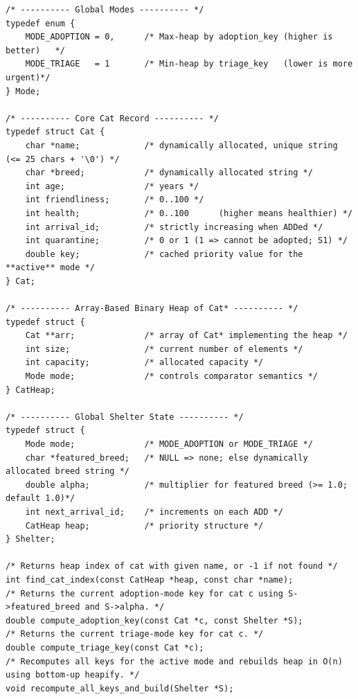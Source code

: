 \documentclass[11pt]{article}
\begin{document}
\begin{codebox}
\begin{lstlisting}
/* ---------- Global Modes ---------- */
typedef enum { 
    MODE_ADOPTION = 0,      /* Max-heap by adoption_key (higher is better)   */
    MODE_TRIAGE   = 1       /* Min-heap by triage_key   (lower is more urgent)*/
} Mode;

/* ---------- Core Cat Record ---------- */
typedef struct Cat {
    char *name;             /* dynamically allocated, unique string (<= 25 chars + '\0') */
    char *breed;            /* dynamically allocated string */
    int age;                /* years */
    int friendliness;       /* 0..100 */
    int health;             /* 0..100      (higher means healthier) */
    int arrival_id;         /* strictly increasing when ADDed */
    int quarantine;         /* 0 or 1 (1 => cannot be adopted; S1) */
    double key;             /* cached priority value for the **active** mode */
} Cat;

/* ---------- Array-Based Binary Heap of Cat* ---------- */
typedef struct {
    Cat **arr;              /* array of Cat* implementing the heap */
    int size;               /* current number of elements */
    int capacity;           /* allocated capacity */
    Mode mode;              /* controls comparator semantics */
} CatHeap;

/* ---------- Global Shelter State ---------- */
typedef struct {
    Mode mode;              /* MODE_ADOPTION or MODE_TRIAGE */
    char *featured_breed;   /* NULL => none; else dynamically allocated breed string */
    double alpha;           /* multiplier for featured breed (>= 1.0; default 1.0)*/
    int next_arrival_id;    /* increments on each ADD */
    CatHeap heap;           /* priority structure */
} Shelter;

/* Returns heap index of cat with given name, or -1 if not found */
int find_cat_index(const CatHeap *heap, const char *name);
/* Returns the current adoption-mode key for cat c using S->featured_breed and S->alpha. */
double compute_adoption_key(const Cat *c, const Shelter *S);
/* Returns the current triage-mode key for cat c. */
double compute_triage_key(const Cat *c);
/* Recomputes all keys for the active mode and rebuilds heap in O(n) using bottom-up heapify. */
void recompute_all_keys_and_build(Shelter *S);


\end{lstlisting}
\end{codebox}
\end{document}
